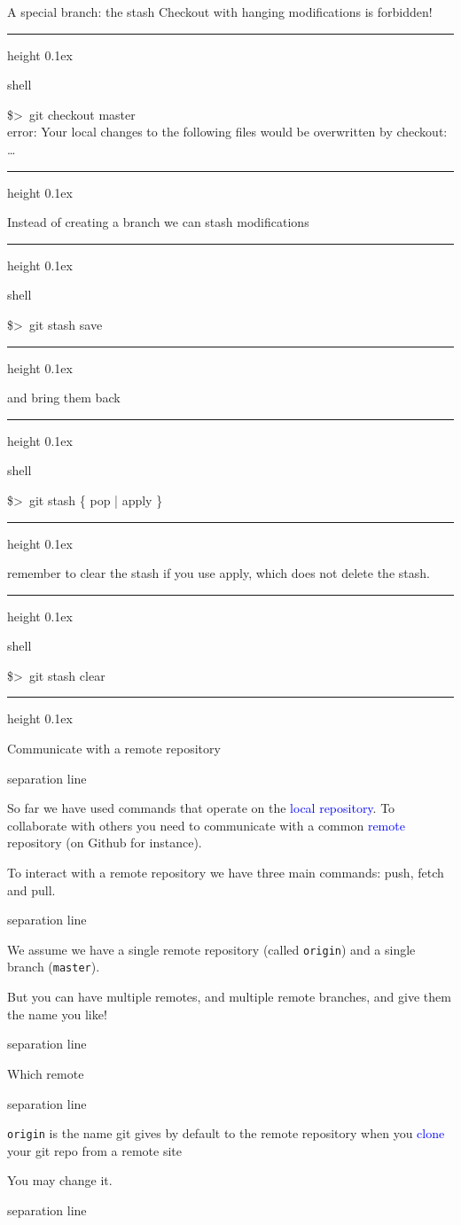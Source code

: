 \documentclass[hyperref={colorlinks}]{beamer}
\newenvironment{shell}{%
\footnotesize\flushleft\hrule height 0.1ex
\tt\begin{beamercolorbox}[sep=1ex,left]{shell}%
}{%
\end{beamercolorbox}
\hrule height 0.1ex
\endflushleft\par
}
\newcommand*{\psone}[1][ant]{\$>~}
\newcommand{\titleline}[1][0.025cm]{%
\begin{beamercolorbox}[wd=\paperwidth,ht=#1,center]{separation line}%
\end{beamercolorbox}%
}
\begin{document}
\begin{frame}{A special branch: the stash}
Checkout with hanging modifications is forbidden!
\begin{shell}
\psone git checkout master\\
error: Your local changes to the following files would be overwritten by checkout: \ldots
\end{shell}
Instead of creating a branch we can stash modifications
\begin{shell}
\psone git stash save
\end{shell}
and bring them back
\begin{shell}
\psone git stash \{ pop | apply \}
\end{shell}
remember to clear the stash if you use apply, which does not delete the stash.
\begin{shell}
\psone git stash clear
\end{shell}
\end{frame}


\begin{frame}{Communicate with a remote repository}
\titleline

So far we have used commands that operate on the \textcolor{blue}{local repository}. To collaborate with others you need to communicate with a common \textcolor{blue}{remote} repository (on Github for instance).

To interact with a remote repository we have three main commands:
\alert{push}, \alert{fetch} and \alert{pull}.
\medskip
\titleline

We assume we have a single remote repository (called \texttt{origin}) and a single branch (\texttt{master}).

But you can have multiple remotes, and multiple remote branches, and give them the name you like!
\titleline
\end{frame}
\begin{frame}{Which remote}
  \titleline
  \alert{\texttt{origin}} is the name git gives by default
  to the remote repository when you \textcolor{blue}{clone}
  your git repo from a remote site
    \medskip
 
    You may change it.
  \titleline
\end{frame}
\end{document}
